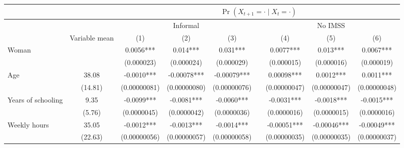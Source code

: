 \begin{tabular}{lclllrlll}
\toprule
      &       & \multicolumn{7}{c}{$\Pr(X_{t+1} = \cdot \;|\; X_{t} = \cdot)$} \\
\midrule
      &       & \multicolumn{3}{c}{Informal  } &       & \multicolumn{3}{c}{No IMSS} \\
\cmidrule{3-5}\cmidrule{7-9}      & Variable mean & \multicolumn{1}{c}{(1)} & \multicolumn{1}{c}{(2)} & \multicolumn{1}{c}{(3)} &       & \multicolumn{1}{c}{(4)} & \multicolumn{1}{c}{(5)} & \multicolumn{1}{c}{(6)} \\
\midrule
\midrule
Woman &       & \multicolumn{1}{c}{0.0056***} & \multicolumn{1}{c}{0.014***} & \multicolumn{1}{c}{0.031***} &       & \multicolumn{1}{c}{0.0077***} & \multicolumn{1}{c}{0.013***} & \multicolumn{1}{c}{0.0067***} \\
      &       & \multicolumn{1}{c}{(0.000023)} & \multicolumn{1}{c}{(0.000024)} & \multicolumn{1}{c}{(0.000029)} &       & \multicolumn{1}{c}{(0.000015)} & \multicolumn{1}{c}{(0.000016)} & \multicolumn{1}{c}{(0.000019)} \\
Age   & 38.08 & \multicolumn{1}{c}{-0.0010***} & \multicolumn{1}{c}{-0.00078***} & \multicolumn{1}{c}{-0.00079***} &       & \multicolumn{1}{c}{0.00098***} & \multicolumn{1}{c}{0.0012***} & \multicolumn{1}{c}{0.0011***} \\
      & (14.81) & \multicolumn{1}{c}{(0.00000081)} & \multicolumn{1}{c}{(0.00000080)} & \multicolumn{1}{c}{(0.00000076)} &       & \multicolumn{1}{c}{(0.00000047)} & \multicolumn{1}{c}{(0.00000047)} & \multicolumn{1}{c}{(0.00000048)} \\
Years of schooling & 9.35  & \multicolumn{1}{c}{-0.0099***} & \multicolumn{1}{c}{-0.0081***} & \multicolumn{1}{c}{-0.0060***} &       & \multicolumn{1}{c}{-0.0031***} & \multicolumn{1}{c}{-0.0018***} & \multicolumn{1}{c}{-0.0015***} \\
      & (5.76) & \multicolumn{1}{c}{(0.0000045)} & \multicolumn{1}{c}{(0.0000042)} & \multicolumn{1}{c}{(0.0000036)} &       & \multicolumn{1}{c}{(0.0000016)} & \multicolumn{1}{c}{(0.0000015)} & \multicolumn{1}{c}{(0.0000016)} \\
Weekly hours & 35.05 & \multicolumn{1}{c}{-0.0012***} & \multicolumn{1}{c}{-0.0013***} & \multicolumn{1}{c}{-0.0014***} &       & \multicolumn{1}{c}{-0.00051***} & \multicolumn{1}{c}{-0.00046***} & \multicolumn{1}{c}{-0.00049***} \\
      & (22.63) & \multicolumn{1}{c}{(0.00000056)} & \multicolumn{1}{c}{(0.00000057)} & \multicolumn{1}{c}{(0.00000058)} &       & \multicolumn{1}{c}{(0.00000035)} & \multicolumn{1}{c}{(0.00000035)} & \multicolumn{1}{c}{(0.00000037)} \\

\end{tabular}

